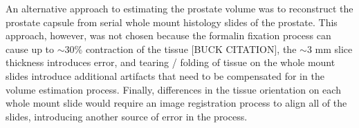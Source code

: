 An alternative approach to estimating the prostate volume was to reconstruct
the prostate capsule from serial whole mount histology slides of the prostate.
This approach, however, was not chosen because the formalin fixation process
can cause up to $\sim$30\% contraction of the tissue [BUCK CITATION], the
$\sim$3 mm slice thickness introduces error, and tearing / folding of tissue on
the whole mount slides introduce additional artifacts that need to be
compensated for in the volume estimation process.  Finally, differences in the
tissue orientation on each whole mount slide would require an image
registration process to align all of the slides, introducing another source of
error in the process.
